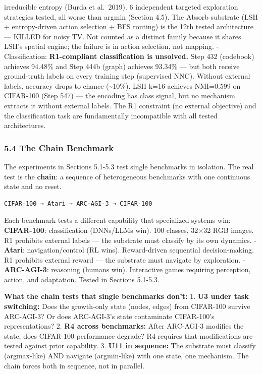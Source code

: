 \documentclass[
  11pt,
]{article}
\begin{document}
irreducible entropy (Burda et al.~2019). 6 independent targeted
exploration strategies tested, all worse than argmin (Section 4.5). The
Absorb substrate (LSH + entropy-driven action selection + BFS routing)
is the 12th tested architecture --- KILLED for noisy TV. Not counted as
a distinct family because it shares LSH's spatial engine; the failure is
in action selection, not mapping. - Classification: \textbf{R1-compliant
classification is unsolved.} Step 432 (codebook) achieves 94.48\% and
Step 444b (graph) achieves 93.34\% --- but both receive ground-truth
labels on every training step (supervised NNC). Without external labels,
accuracy drops to chance (\textasciitilde10\%). LSH k=16 achieves
NMI=0.599 on CIFAR-100 (Step 547) --- the encoding has class signal, but
no mechanism extracts it without external labels. The R1 constraint (no
external objective) and the classification task are fundamentally
incompatible with all tested architectures.

\subsubsection{5.4 The Chain Benchmark}\label{the-chain-benchmark}

The experiments in Sections 5.1-5.3 test single benchmarks in isolation.
The real test is the \textbf{chain}: a sequence of heterogeneous
benchmarks with one continuous state and no reset.

\begin{verbatim}
CIFAR-100 → Atari → ARC-AGI-3 → CIFAR-100
\end{verbatim}

Each benchmark tests a different capability that specialized systems
win: - \textbf{CIFAR-100}: classification (DNNs/LLMs win). 100 classes,
32×32 RGB images. R1 prohibits external labels --- the substrate must
classify by its own dynamics. - \textbf{Atari}: navigation/control (RL
wins). Reward-driven sequential decision-making. R1 prohibits external
reward --- the substrate must navigate by exploration. -
\textbf{ARC-AGI-3}: reasoning (humans win). Interactive games requiring
perception, action, and adaptation. Tested in Sections 5.1-5.3.

\textbf{What the chain tests that single benchmarks don't:} 1.
\textbf{U3 under task switching:} Does the growth-only state (nodes,
edges) from CIFAR-100 survive ARC-AGI-3? Or does ARC-AGI-3's state
contaminate CIFAR-100's representations? 2. \textbf{R4 across
benchmarks:} After ARC-AGI-3 modifies the state, does CIFAR-100
performance degrade? R4 requires that modifications are tested against
prior capability. 3. \textbf{U11 in sequence:} The substrate must
classify (argmax-like) AND navigate (argmin-like) with one state, one
mechanism. The chain forces both in sequence, not in parallel.
\end{document}
